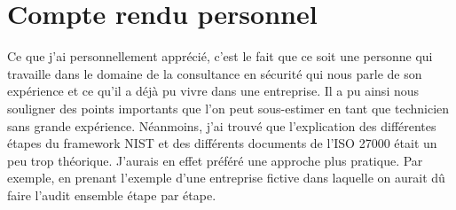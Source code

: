 \documentclass[a4paper]{article}
\begin{document}
\newpage
\section{Compte rendu personnel}
Ce que j'ai personnellement apprécié, c'est le fait que ce soit une personne qui travaille dans le domaine de la consultance en sécurité qui nous parle de son expérience et ce qu'il a déjà pu vivre dans une entreprise. Il a pu ainsi nous souligner des points importants que l'on peut sous-estimer en tant que technicien sans grande expérience. Néanmoins, j'ai trouvé que l'explication des différentes étapes du framework NIST et des différents documents de l'ISO 27000 était un peu trop théorique. J'aurais en effet préféré une approche plus pratique. Par exemple, en prenant l'exemple d'une entreprise fictive dans laquelle on aurait dû faire l'audit ensemble étape par étape.




\end{document}
